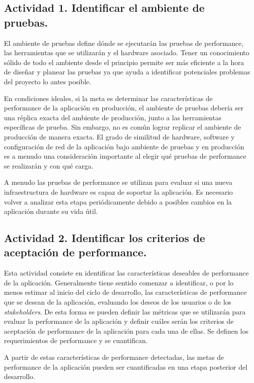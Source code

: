 \subsection{Actividad 1. Identificar el ambiente de pruebas.}
El ambiente de pruebas define dónde se ejecutarán las pruebas de performance, las herramientas que se utilizarán y el hardware asociado. 
Tener un conocimiento sólido de todo el ambiente desde el principio permite ser más eficiente a la hora de diseñar y planear las pruebas ya que ayuda a identificar potenciales problemas del proyecto lo antes posible.

En condiciones ideales, si la meta es determinar las características de performance de la aplicación en producción, el ambiente de pruebas debería ser una réplica exacta del ambiente de producción, junto a las herramientas específicas de prueba. Sin embargo, no es común lograr replicar el ambiente de producción de manera exacta. El grado de similitud de hardware, software y configuración de
red de la aplicación bajo ambiente de pruebas y en producción es a menudo una consideración importante al elegir qué pruebas de performance se realizarán y con qué
carga.

A menudo las pruebas de performance se utilizan para evaluar si una nueva infraestructura de hardware es capaz de soportar la aplicación.
Es necesario volver a analizar esta etapa periódicamente debido a posibles cambios en la aplicación durante su vida útil.

\subsection{Actividad 2. Identificar los criterios de aceptación de performance.}
Esta actividad consiste en identificar las características deseables de performance de la aplicación.
Generalmente tiene sentido comenzar a identificar, o por lo menos estimar al inicio del ciclo de desarrollo, las características de performance que se desean de la aplicación, evaluando los deseos de los usuarios o de los \emph{stakeholders}. De esta forma se pueden definir las métricas que se utilizarán para evaluar la performance de la aplicación y definir cuáles serán los criterios de aceptación de performance de la aplicación para cada una de ellas. Se definen los requerimientos de performance y se cuantifican. 

A partir de estas características de performance detectadas, las metas de performance de la aplicación pueden ser cuantificadas en una etapa posterior del desarrollo.

